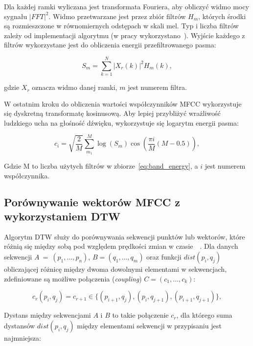 Dla każdej ramki wyliczana jest transformata Fouriera, aby
obliczyć widmo mocy sygnału $|FFT|^2$. Widmo przetwarzane jest
przez zbiór filtrów $H_m$, których środki są rozmieszczone
w równomiernych odstępach w skali mel. Typ i liczba filtrów zależy
od implementacji algorytmu (w pracy wykorzystano~\cite{librosa}).
Wyjście każdego z filtrów wykorzystane
jest do obliczenia energii przefiltrowanego pasma:

\begin{equation}
  S_m = \sum_{k=1}^{N}| X_r(k) |^2 H_m(k),
  \label{eq:band_energy}
\end{equation}

\noindent
gdzie $X_r$ oznacza widmo danej ramki, $m$ jest numerem filtra.

W ostatnim kroku do obliczenia wartości współczynników MFCC
wykorzystuje się dyskretną transformatę kosinusową.
Aby lepiej przybliżyć wrażliwość ludzkiego ucha na głośność dźwięku,
wykorzystuje się logarytm energii pasma:

\begin{equation}
  c_i = \sqrt{\frac{2}{M}} \sum_{m_1}^{M} \log(S_m) \cos( \frac{\pi i}{M}(M - 0.5) ),
  \label{eq:mfcc_coefficients}
\end{equation}

Gdzie M to liczba użytych filtrów w zbiorze~\ref{eq:band_energy},
a $i$ jest numerem współczynnika.

\subsection{Porównywanie wektorów MFCC z wykorzystaniem DTW}

Algorytm DTW służy do porównywania sekwencji punktów lub wektorów, które
różnią się między sobą pod względem prędkości zmian w czasie~\cite{dtw_time_complexity}~\cite{mfcc_dtw}.
Dla danych sekwencji $A~=~(p_1, \ldots, p_n)$, $B = (q_1, \ldots, q_m)$
oraz funkcji $dist(p_i, q_j)$ obliczającej różnicę między dwoma dowolnymi elementami w sekwencjach,
zdefiniowane są możliwe połączenia (\textit{coupling}) $C = (c_1, \ldots, c_k)$:

\begin{equation}
  c_r(p_i, q_j) = c_{r+1} \in \{ (p_{i+1}, q_j), (p_i, q_{j+1}), (p_{i+1}, q_{j+1}) \},
  \label{eq:dtw_coupling}
\end{equation}

Dystans między sekwencjami $A$ i $B$ to takie połączenie $c_r$, dla którego
suma dystansów $dist(p_i, q_j)$ między elementami sekwencji w przypisaniu
jest najmniejsza:

